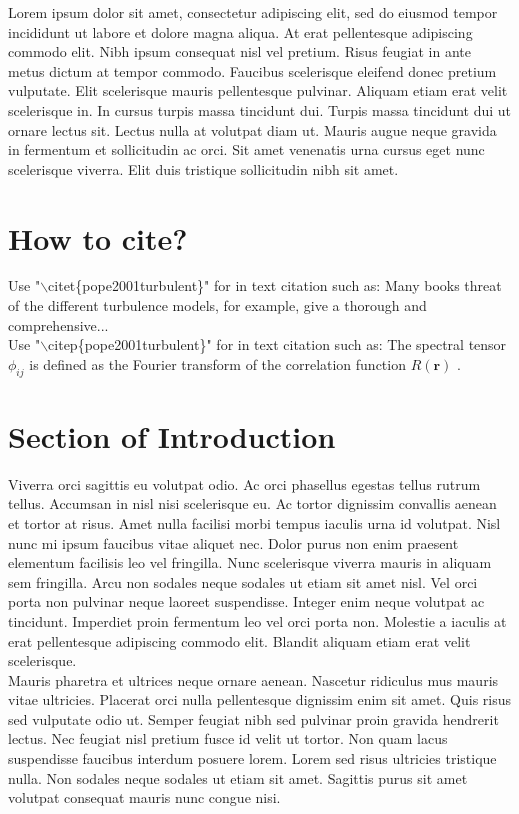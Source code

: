 Lorem ipsum dolor sit amet, consectetur adipiscing elit, sed do eiusmod tempor incididunt ut labore et dolore magna aliqua. At erat pellentesque adipiscing commodo elit. Nibh ipsum consequat nisl vel pretium. Risus feugiat in ante metus dictum at tempor commodo. Faucibus scelerisque eleifend donec pretium vulputate. Elit scelerisque mauris pellentesque pulvinar. Aliquam etiam erat velit scelerisque in. In cursus turpis massa tincidunt dui. Turpis massa tincidunt dui ut ornare lectus sit. Lectus nulla at volutpat diam ut. Mauris augue neque gravida in fermentum et sollicitudin ac orci. Sit amet venenatis urna cursus eget nunc scelerisque viverra. Elit duis tristique sollicitudin nibh sit amet.

\section{How to cite?}
Use "$\backslash$citet\{pope2001turbulent\}" for in text citation such as: Many books threat of the different turbulence models, for example, \citet{pope2001turbulent} give a thorough and comprehensive...\\

Use "$\backslash$citep\{pope2001turbulent\}" for in text citation such as: The spectral tensor $\phi_{ij}$ is defined as the Fourier transform of the correlation function $R(\textbf{r})$ \citep{pope2001turbulent}.\\

\section{Section of Introduction}

Viverra orci sagittis eu volutpat odio. Ac orci phasellus egestas tellus rutrum tellus. Accumsan in nisl nisi scelerisque eu. Ac tortor dignissim convallis aenean et tortor at risus. Amet nulla facilisi morbi tempus iaculis urna id volutpat. Nisl nunc mi ipsum faucibus vitae aliquet nec. Dolor purus non enim praesent elementum facilisis leo vel fringilla. Nunc scelerisque viverra mauris in aliquam sem fringilla. Arcu non sodales neque sodales ut etiam sit amet nisl. Vel orci porta non pulvinar neque laoreet suspendisse. Integer enim neque volutpat ac tincidunt. Imperdiet proin fermentum leo vel orci porta non. Molestie a iaculis at erat pellentesque adipiscing commodo elit. Blandit aliquam etiam erat velit scelerisque.\\

Mauris pharetra et ultrices neque ornare aenean. Nascetur ridiculus mus mauris vitae ultricies. Placerat orci nulla pellentesque dignissim enim sit amet. Quis risus sed vulputate odio ut. Semper feugiat nibh sed pulvinar proin gravida hendrerit lectus. Nec feugiat nisl pretium fusce id velit ut tortor. Non quam lacus suspendisse faucibus interdum posuere lorem. Lorem sed risus ultricies tristique nulla. Non sodales neque sodales ut etiam sit amet. Sagittis purus sit amet volutpat consequat mauris nunc congue nisi.

